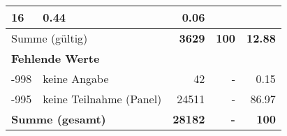 \begin{longtable}{lXrrr}
       \num{16} &
       \num[round-mode=places,round-precision=2]{0,44} &
         \num[round-mode=places,round-precision=2]{0,06} \\
     \midrule
     \multicolumn{2}{l}{Summe (gültig)} &
       \textbf{\num{3629}} &
     \textbf{100} &
       \textbf{\num[round-mode=places,round-precision=2]{12,88}} \\
     \multicolumn{5}{l}{\textbf{Fehlende Werte}}\\
       -998 &
       keine Angabe &
         \num{42} &
        - &
         \num[round-mode=places,round-precision=2]{0,15} \\
       -995 &
       keine Teilnahme (Panel) &
         \num{24511} &
        - &
         \num[round-mode=places,round-precision=2]{86,97} \\
     \midrule
     \multicolumn{2}{l}{\textbf{Summe (gesamt)}} &
          \textbf{\num{28182}} &
        \textbf{-} &
        \textbf{100} \\
     \bottomrule
     \end{longtable}
     
